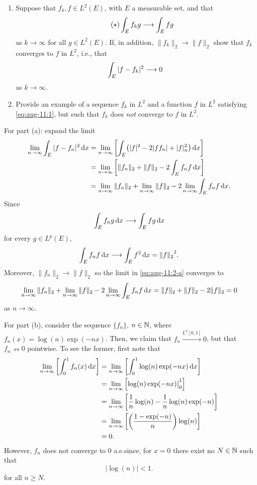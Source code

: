 \begin{problem}
  \hfill
  \begin{enumerate}[label=(\alph*)]
  \item Suppose that \(f_k,f\in L^2(E)\), with \(E\) a measurable set, and
    that
    \[
      \label{eq:aug-11:1}
      \tag{\(\star\)}
      \int_E f_kg\longrightarrow\int_E fg
    \]
    as \(k\to\infty\) for all \(g\in L^2(E)\). If, in addition,
    \(\|f_k\|_2\to\|f\|_2\) show that \(f_k\) converges to \(f\) in
    \(L^2\), i.e., that
    \[
      \int_E|f-f_k|^2\longrightarrow 0
    \]
    as \(k\to\infty\).
  \item Provide an example of a sequence \(f_k\) in \(L^2\) and a function
    \(f\) in \(L^2\) satisfying \eqref{eq:aug-11:1}, but such that \(f_k\)
    does \emph{not} converge to \(f\) in \(L^2\).
  \end{enumerate}
\end{problem}
\begin{solution}
  For part (a): expand the limit
  \begin{gather}
    \label{eq:aug-11:2-a}
    \begin{aligned}
      \lim_{n\to\infty}\int_E|f-f_n|^2\mathop{}\!\mathrm{d} x
      &=\lim_{n\to\infty}\left[\int_E\bigl(|f|^2-2|ff_n|+|f|_n^2\bigr)\mathop{}\!\mathrm{d} x\right]\\
      &=\lim_{n\to\infty}\left[\|f_n\|_2+\|f\|_2-2\int_E f_nf\mathop{}\!\mathrm{d} x\right]\\
      &=\lim_{n\to\infty}\|f_n\|_2+\lim_{n\to\infty}\|f\|_2-2\lim_{n\to\infty}\int_E
      f_nf\mathop{}\!\mathrm{d} x.
    \end{aligned}
  \end{gather}
  Since
  \[
    \int_Ef_ng\mathop{}\!\mathrm{d} x\longrightarrow \int_E fg\mathop{}\!\mathrm{d} x
  \]
  for every \(g\in L^p(E)\),
  \[
    \int_E f_nf\diff x\too \int_Ef^2\diff x={\|f\|_2}^{\cramped 2}.
  \]
  Moreover, \(\|f_n\|_2\to\|f\|_2\) so the limit in \eqref{eq:aug-11:2-a}
  converges to
  \[
    \lim_{n\to\infty}\|f_n\|_2+\lim_{n\to\infty}\|f\|_2-2\lim_{n\to\infty}\int_E
    f_nf\diff x
    =%
    \|f\|_2+\|f\|_2-2\|f\|_2=0
  \]
  as \(n\to\infty\).

  For part (b), consider the sequence \(\{f_n\}\), \(n\in\mathbb{N}\), where
  \(f_n(x)=\log(n)\exp(-nx)\). Then, we claim that
  \(f_n\xrightarrow{L^2[0,1]}0\), but that \(f_n\nrightarrow 0\)
  pointwise. To see the former, first note that
  \[
    \begin{aligned}
      \lim_{n\to\infty}\left[\int_0^1 f_n(x)\diff x\right]
      &=\lim_{n\to\infty}\left[\int_0^1\log(n)\exp(-nx)\diff x\right]\\
      &=\lim_{n\to\infty}\left[\log(n)\exp(-nx)\bigr|_0^1\right]\\
      &=\lim_{n\to\infty}\left[
      \frac{1}{n}\log(n)-\frac{1}{n}\log(n)\exp(-n)
      \right]\\
      &=\lim_{n\to\infty}\left[%
        \left(\frac{1-\exp(-n)}{n}\right)\log(n)%
      \right]\\
      &=0.
    \end{aligned}
  \]
  However, \(f_n\) does not converge to \(0\) a.e.\@ since, for
  \(x=0\) there exist no \(N\in\mathbb{N}\) such that
  \[
    |{\log(n)}|<1.
  \]
  for all \(n\geq N\).
\end{solution}

